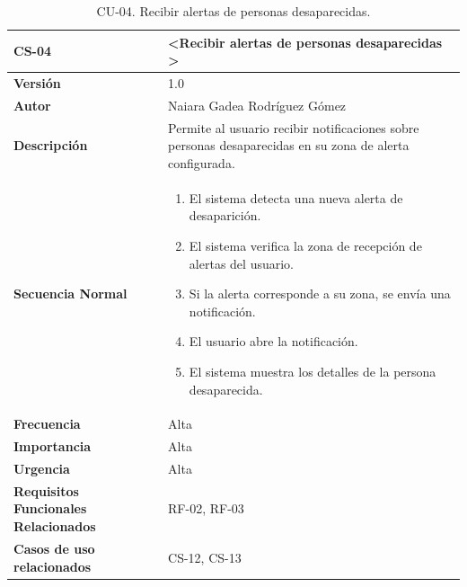 \begin{table}[htbp] %
\centering
\begin{tabular}{ |m{3cm}|m{11cm}|  } 
\hline
\cellcolor[HTML]{B9E3F0}\centering\textbf{CS-04} & \cellcolor[HTML]{B9E3F0}\textbf{\textless Recibir alertas de personas desaparecidas \textgreater}\\

\hline
\cellcolor[HTML]{EFEFEF}\textbf{Versión}             & 1.0  \\
\hline
\cellcolor[HTML]{EFEFEF}\textbf{Autor}                & Naiara Gadea Rodríguez Gómez\\
\hline
\cellcolor[HTML]{EFEFEF}\textbf{Descripción}                & { Permite al usuario recibir notificaciones sobre personas desaparecidas en su zona de alerta configurada. }\\
\hline
\cellcolor[HTML]{EFEFEF}\textbf{Secuencia \newline Normal}                &                 
        \begin{enumerate}
            \item El sistema detecta una nueva alerta de desaparición.
            \item El sistema verifica la zona de recepción de alertas del usuario.
            \item Si la alerta corresponde a su zona, se envía una notificación.
            \item El usuario abre la notificación.
            \item El sistema muestra los detalles de la persona desaparecida.
        \end{enumerate}\\
\hline
\cellcolor[HTML]{EFEFEF}\textbf{Frecuencia}                & Alta\\
\hline
\cellcolor[HTML]{EFEFEF}\textbf{Importancia}                & Alta\\
\hline
\cellcolor[HTML]{EFEFEF}\textbf{Urgencia}                & Alta\\
\hline
\cellcolor[HTML]{EFEFEF}\textbf{Requisitos Funcionales Relacionados}                & { RF-02, RF-03 }\\
\hline
\cellcolor[HTML]{EFEFEF}\textbf{Casos de uso relacionados}                & { CS-12, CS-13 }\\
\hline
\end{tabular}
\caption{CU-04. Recibir alertas de personas desaparecidas.}
\end{table}


